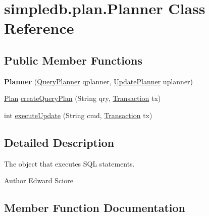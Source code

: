 \hypertarget{classsimpledb_1_1plan_1_1Planner}{}\section{simpledb.\+plan.\+Planner Class Reference}
\label{classsimpledb_1_1plan_1_1Planner}
\subsection*{Public Member Functions}
\begin{DoxyCompactItemize}
\item 
\mbox{\label{classsimpledb_1_1plan_1_1Planner_a04a3e0905b8bd2f118088313a10e1a6f}} 
{\bfseries Planner} (\hyperlink{interfacesimpledb_1_1plan_1_1QueryPlanner}{Query\+Planner} qplanner, \hyperlink{interfacesimpledb_1_1plan_1_1UpdatePlanner}{Update\+Planner} uplanner)
\item 
\hyperlink{interfacesimpledb_1_1plan_1_1Plan}{Plan} \hyperlink{classsimpledb_1_1plan_1_1Planner_a73253aa589ee3214e8e056e4dc0845c4}{create\+Query\+Plan} (String qry, \hyperlink{classsimpledb_1_1tx_1_1Transaction}{Transaction} tx)
\item 
int \hyperlink{classsimpledb_1_1plan_1_1Planner_a4bf5b4eb298f5719f24a4464bf168e17}{execute\+Update} (String cmd, \hyperlink{classsimpledb_1_1tx_1_1Transaction}{Transaction} tx)
\end{DoxyCompactItemize}


\subsection{Detailed Description}
The object that executes S\+QL statements. \begin{DoxyAuthor}{Author}
Edward Sciore 
\end{DoxyAuthor}


\subsection{Member Function Documentation}
\mbox{\label{classsimpledb_1_1plan_1_1Planner_a73253aa589ee3214e8e056e4dc0845c4}} 
